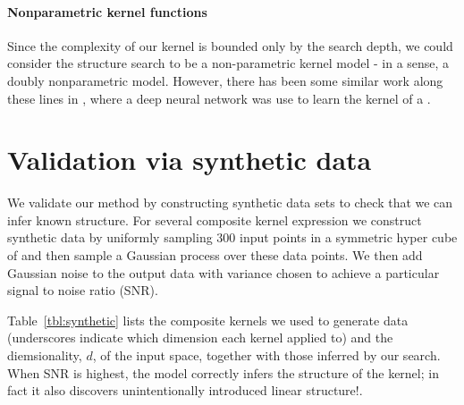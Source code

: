 \documentclass[twoside]{article}
\begin{document}
\paragraph{Nonparametric kernel functions}

Since the complexity of our kernel is bounded only by the search depth, we could consider the structure search to be a non-parametric kernel model - in a sense, a doubly nonparametric model.  However, there has been some similar work along these lines in \cite{salakhutdinov2008using}, where a deep neural network was use to learn the kernel of a \gp{}.


\section{Validation via synthetic data}

We validate our method by constructing synthetic data sets to check that we can infer known structure.
For several composite kernel expression we construct synthetic data by uniformly sampling 300 input points in a symmetric hyper cube of and then sample a Gaussian process over these data points.
We then add \iid Gaussian noise to the output data with variance chosen to achieve a particular signal to noise ratio (SNR\footnotemark).

Table~\ref{tbl:synthetic} lists the composite kernels we used to generate data (underscores indicate which dimension each kernel applied to) and the diemsionality, $d$, of the input space, together with those inferred by our search.
When SNR is highest, the model correctly infers the structure of the kernel; in fact it also discovers unintentionally introduced linear structure\footnotemark!.

\end{document}
